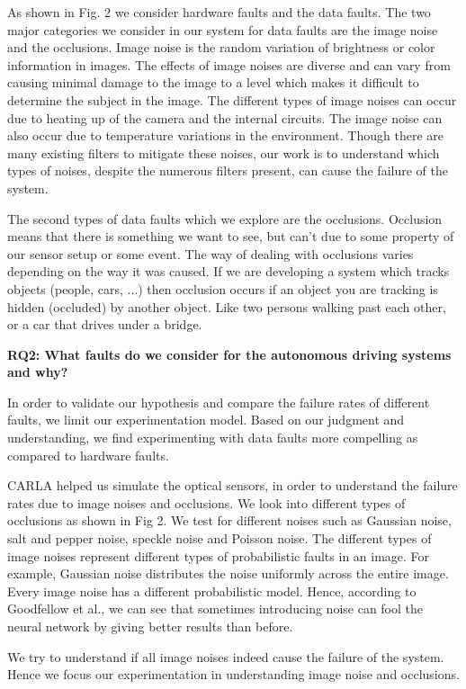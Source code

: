 As shown in Fig. 2 we consider hardware faults and the data faults. The two major categories we consider in our system for data faults are the image noise and the occlusions. Image noise is the random variation of brightness or color information in images.
The effects of image noises are diverse and can vary from causing minimal damage to the image to
a level which makes it difficult to determine the subject in the image. The different types of image noises can occur due to heating up of the camera and the internal circuits. The image noise can also occur due to temperature variations in the environment. Though there are many existing filters to mitigate these noises, our work is to understand which types of noises, despite the numerous filters present, can cause the failure of the system. 

The second types of data faults which we explore are the occlusions. Occlusion means that there is something we want to see, but can't due to some property of our sensor setup or some event. The way of dealing with occlusions varies depending on the way it was caused. If we are developing a system which tracks objects (people, cars, ...) then occlusion occurs if an object you are tracking is hidden (occluded) by another object. Like two persons walking past each other, or a car that drives under a bridge.

\textbf{RQ2: What faults do we consider for the autonomous driving systems and why?}

In order to validate our hypothesis and compare the failure rates of different faults, we limit our experimentation model. Based on our judgment and understanding, we find experimenting with data faults more compelling as compared to hardware faults. 

CARLA helped us simulate the optical sensors, in order to understand the failure rates due to image noises and occlusions. We look into different types of occlusions as shown in Fig 2. We test for different noises such as Gaussian noise, salt and pepper noise, speckle noise and Poisson noise. The different types of image noises represent different types of probabilistic faults in an image. For example, Gaussian noise distributes the noise uniformly across the entire image. Every image noise has a different probabilistic model. Hence, according to Goodfellow et al.\cite{Goodfellow}, we can see that sometimes introducing noise can fool the neural network by giving better results than before. 

We try to understand if all image noises indeed cause the failure of the system. Hence we focus our experimentation in understanding image noise and occlusions.

